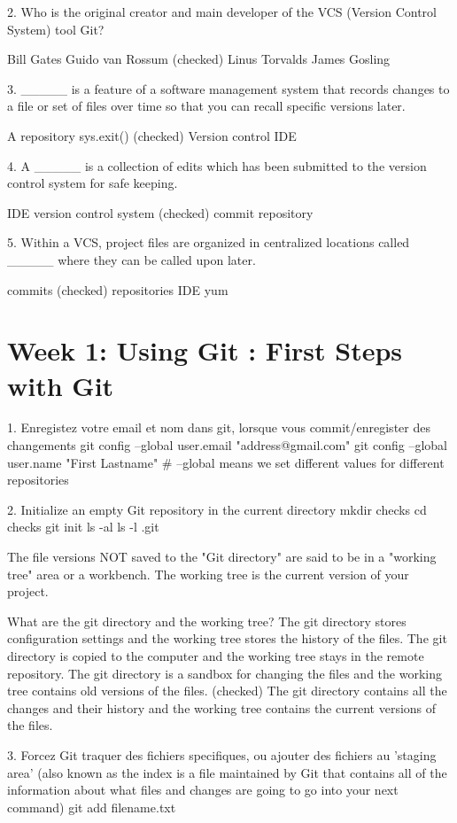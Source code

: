 \documentclass[11pt, onecolumn]{article}
\begin{document}
2. Who is the original creator and main developer of the VCS (Version Control System) tool Git?

Bill Gates
Guido van Rossum
(checked) Linus Torvalds
James Gosling


3. _____ is a feature of a software management system that records changes to a file or set of files over time so that you can recall specific versions later.

A repository
sys.exit()
(checked) Version control
IDE


4. A _____ is a collection of edits which has been submitted to the version control system for safe keeping.

IDE
version control system
(checked) commit
repository


5. Within a VCS, project files are organized in centralized locations called _____ where they can be called upon later.

commits
(checked) repositories
IDE
yum


\section{Week 1: Using Git : First Steps with Git}

1. Enregistez votre email et nom dans git, lorsque vous commit/enregister des changements
git config --global user.email "address@gmail.com"
git config --global user.name "First Lastname"   # --global means we set different values for different repositories


2. Initialize an empty Git repository in the current directory
mkdir checks
cd checks
git init
ls -al
ls -l .git

The file versions NOT saved to the "Git directory" are said to be in a "working tree" area or a workbench. The working tree is the current version of your project.

What are the git directory and the working tree?
The git directory stores configuration settings and the working tree stores the history of the files.
The git directory is copied to the computer and the working tree stays in the remote repository.
The git directory is a sandbox for changing the files and the working tree contains old versions of the files.
(checked) The git directory contains all the changes and their history and the working tree contains the current versions of the files.

3. Forcez Git traquer des fichiers specifiques, ou ajouter des fichiers au 'staging area' (also known as the index is a file maintained by Git that contains all of the information about what files and changes are going to go into your next command)
git add filename.txt
\end{document}
